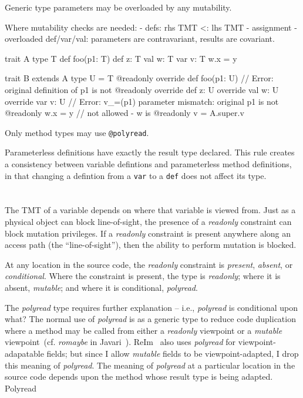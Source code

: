 \documentclass[letterpaper,11pt]{article}
\newcommand{\code}[1]{\lstinline$#1$}
\begin{document}
	
	{}

Generic type parameters may be overloaded by any mutability.

Where mutability checks are needed:
- defs: rhs TMT <: lhs TMT
- assignment
- overloaded def/var/val: parameters are contravariant, results are covariant.
	


	trait A {
		type T
		def foo(p1: T)
		def z: T
		val w: T
		var v: T
		w.x = y
	}

	trait B extends A {
		type U = T @readonly
		override def foo(p1: U)   // Error: original definition of p1 is not @readonly
		override def z: U
		override val w: U
		override var v: U         // Error: v_=(p1) parameter mismatch: original p1 is not @readonly
		w.x = y  // not allowed - w is @readonly
		v = A.super.v
	}
	
	{}

Only method types may use \code{@polyread}.

Parameterless definitions %
have exactly the result type declared.
This rule creates a consistency between variable defintions and parameterless
method definitions, in that changing a defintion from a \code{var} to a \code{def}
does not affect its type.





\section{}

The TMT of a variable depends on where that variable is viewed from.
Just as a physical object can block line-of-sight,
the presence of a \emph{readonly} constraint can block mutation privileges.
If a \emph{readonly} constraint is present anywhere along an access path (the ``line-of-sight''),
then the ability to perform mutation is blocked.

At any location in the source code, the \emph{readonly} constraint is
\emph{present}, \emph{absent}, or \emph{conditional}.
Where the constraint is present, the type is \emph{readonly};
where it is absent, \emph{mutable}; and
where it is conditional, \emph{polyread}.

The \emph{polyread} type requires further explanation --
i.e., \emph{polyread} is conditional upon what?
The normal use of \emph{polyread} is as a generic type to reduce code duplication
where a method may be called from either a \emph{readonly} viewpoint
or a \emph{mutable} viewpoint~(cf. \emph{romaybe} in Javari~\cite{javari}).
ReIm~\cite{reim} also uses \emph{polyread} for viewpoint-adapatable fields;
but since I allow \emph{mutable} fields to be viewpoint-adapted,
I drop this meaning of \emph{polyread}.
The meaning of \emph{polyread} at a particular location in the source code
depends upon the method whose result type is being adapted.
Polyread
\end{document}
